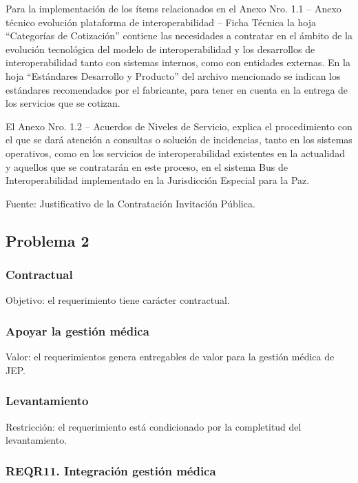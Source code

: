 \documentclass[
  paper=a4,
  ,captions=tableheading
]{scrartcl}
\begin{document}
Para la implementación de los ítems relacionados en el Anexo Nro. 1.1 --
Anexo técnico evolución plataforma de interoperabilidad -- Ficha Técnica
la hoja ``Categorías de Cotización'' contiene las necesidades a
contratar en el ámbito de la evolución tecnológica del modelo de
interoperabilidad y los desarrollos de interoperabilidad tanto con
sistemas internos, como con entidades externas. En la hoja ``Estándares
Desarrollo y Producto'' del archivo mencionado se indican los estándares
recomendados por el fabricante, para tener en cuenta en la entrega de
los servicios que se cotizan.

El Anexo Nro. 1.2 -- Acuerdos de Niveles de Servicio, explica el
procedimiento con el que se dará atención a consultas o solución de
incidencias, tanto en los sistemas operativos, como en los servicios de
interoperabilidad existentes en la actualidad y aquellos que se
contratarán en este proceso, en el sistema Bus de Interoperabilidad
implementado en la Jurisdicción Especial para la Paz.

Fuente: Justificativo de la Contratación Invitación Pública.

\subsection{Problema 2}\label{sec:problema-2}

\subsubsection{Contractual}\label{sec:contractual-1}

Objetivo: el requerimiento tiene carácter contractual.

\subsubsection{Apoyar la gestión
médica}\label{sec:apoyar-la-gestiuxf3n-muxe9dica}

Valor: el requerimientos genera entregables de valor para la gestión
médica de JEP.

\subsubsection{Levantamiento}\label{sec:levantamiento-1}

Restricción: el requerimiento está condicionado por la completitud del
levantamiento.

\subsubsection{REQR11. Integración gestión
médica}\label{sec:reqr11.-integraciuxf3n-gestiuxf3n-muxe9dica}
\end{document}
